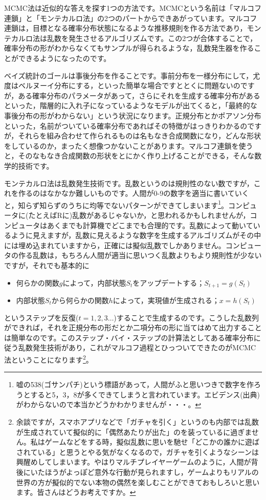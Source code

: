 \documentclass{ltjsbook}
\begin{document}
MCMC法は近似的な答えを探す1つの方法です。MCMCという名前は「マルコフ連鎖」と「モンテカルロ法」の2つのパートからできあがっています。マルコフ連鎖は，目標となる確率分布状態になるような推移規則を作る方法であり，モンテカルロ法は乱数を発生させるアルゴリズムです。この2つが合体することで，確率分布の形がわからなくてもサンプルが得られるような，乱数発生器を作ることができるようになったのです。

ベイズ統計のゴールは事後分布を作ることです。事前分布を一様分布にして，尤度はベルヌーイ分布にする，といった簡単な場合ですととくに問題ないのですが，ある確率分布のパラメータがあって，さらにそれを生成する確率分布があるといった，階層的に入れ子になっているようなモデルが出てくると，「最終的な事後分布の形がわからない」という状況になります。正規分布とかポアソン分布といった，名前がついている確率分布であればその特徴がはっきりわかるのですが，それらを組み合わせて作られるものは名もなき合成関数になり，どんな形状をしているのか，まったく想像つかないことがあります。マルコフ連鎖を使うと，そのなもなき合成関数の形状をとにかく作り上げることができる，そんな数学的技術です。

モンテカルロ法は乱数発生技術です。乱数というのは規則性のない数ですが，これを作るのはなかなか難しいものです。人間が0-9の数字を適当に書いていくと，知らず知らずのうちに均等でないパターンができてしまいます\footnote{嘘の538(ゴサンパチ)という標語があって，人間がふと思いつきで数字を作ろうとすると5，3，8が多くできてしまうと言われています。エビデンス(出典)がわからないので本当かどうかわかりませんが・・・。}。コンピュータに(たとえばRに)乱数があるじゃないか，と思われるかもしれませんが，コンピュータはあくまでも計算機でどこまでも合理的です。乱数によって動いているように見えますが，乱数に見えるような数字を生成するアルゴリズムがその中には埋め込まれていますから，正確には擬似乱数でしかありません。コンピュータの作る乱数は，もちろん人間が適当に思いつく乱数よりもより規則性が少ないですが，それでも基本的に
\begin{itemize}
	\item 何らかの関数$g$によって，内部状態$S_t$をアップデートする；$S_{t+1}=g(S_t)$
	\item 内部状態$S_t$から何らかの関数$h$によって，実現値が生成される；$x = h(S_t)$
\end{itemize}
というステップを反復($t=1,2,3\ldots$)することで生成するのです。こうした乱数列ができれば，それを正規分布の形だとか二項分布の形に当てはめて出力することは簡単なのです。このステップ・バイ・ステップの計算法としてある確率分布に従う乱数発生技術があり，これがマルコフ過程とひっついてできたのがMCMC法ということになります\footnote{余談ですが，スマホアプリなどで「ガチャを引く」というのも内部では乱数が生成されていて擬似的に「偶然あたりが出た」のを装っているに過ぎません。私はゲームなどをする時，擬似乱数に思いを馳せ「どこかの誰かに遊ばされている」と思うとやる気がなくなるので，ガチャを引くようなシーンは興醒めしてしまいます。やはりマルチプレイヤーゲームのように，人間が背後にいたほうがよっぽど意外な行動が見られますし，ゲームよりもリアルの世界の方が擬似的でない本物の偶然を楽しむことができておもしろいと思います。皆さんはどうお考えですか。}。
\end{document}
